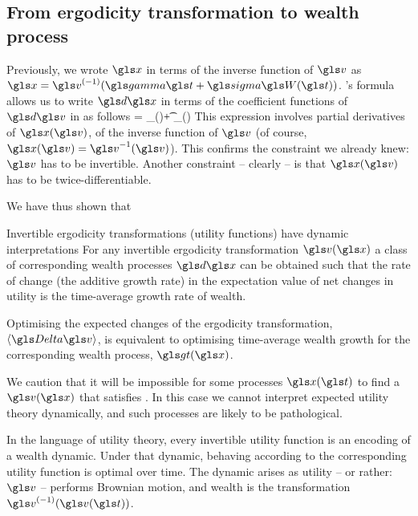 \subsection{From ergodicity transformation to wealth process}
Previously, we wrote $\x$ in terms of the inverse function of $\gv$
as $\x=\gv^{(-1)}(\ggamma \t+\gsigma \gW(\t))$.
\Ito's formula allows us to write $\gd\x$ in terms of the coefficient functions 
of $\gd \gv$ in  as follows
\be
\gd\x = _{\ax(\x)}\gd\t + \underbrace{\bv \frac{\partial \x}{\partial \gv}}_{\bx(\x)} \gd\gW
{}
\ee
This expression involves partial derivatives of $\x(\gv)$, \ie of the inverse function of $\gv$ 
(of course, $\x(\gv)=\gv^{-1}(\gv)$). This confirms the constraint we already knew: $\gv$ 
has to be invertible. 
%
Another constraint -- clearly -- is that $\x(\gv)$ has to be twice-differentiable.

We have thus shown that 
\begin{keypts}{Invertible ergodicity transformations (utility functions) have dynamic interpretations}
For any invertible ergodicity transformation $\gv(\x)$ a class of corresponding
wealth processes $\gd\x$ can be obtained such that the rate of
change (\ie the additive growth rate) in the expectation value of net changes 
in utility is the time-average growth rate of wealth.
\end{keypts}
Optimising the expected changes of the ergodicity transformation, $\ave{\D\gv}$,
is equivalent to optimising time-average wealth growth for the
corresponding wealth process, $\gt(\x)$. 

We caution that it will be impossible for some processes $\x(\t)$ to find a $\gv(\x)$
that satisfies . 
In this case we cannot interpret expected utility theory dynamically,
and such processes are likely to be pathological. 


In the language of utility theory, every invertible utility 
function is an encoding of a wealth dynamic. Under that dynamic, behaving according to the
corresponding utility function is optimal over time. The dynamic arises as utility -- or rather: $\gv$ -- performs
Brownian motion, and wealth is the transformation $\gv^{(-1)}(\gv(\t))$. 

